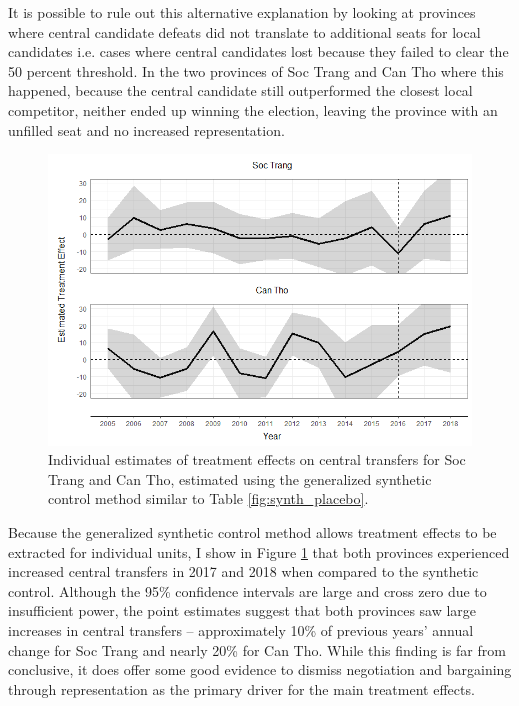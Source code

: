 \documentclass[12pt]{article}
\newcommand{\1}{\mathbbm{1}}
\begin{document}
It is possible to rule out this alternative explanation by looking at provinces where central candidate defeats did not translate to additional seats for local candidates i.e. cases where central candidates lost because they failed to clear the 50 percent threshold. In the two provinces of Soc Trang and Can Tho where this happened, because the central candidate still outperformed the closest local competitor, neither ended up winning the election, leaving the province with an unfilled seat and no increased representation. 

\begin{figure}[!htbp]
	\centering
	\includegraphics[width=\textwidth]{figure/190618_synth_results_2prov.png}
	\captionsetup{singlelinecheck=off}
	\caption[Individual synthetic control treatment effects]{Individual estimates of treatment effects on central transfers for Soc Trang and Can Tho, estimated using the generalized synthetic control method similar to Table \ref{fig:synth_placebo}.}
	\label{fig:synth_mech}
\end{figure}

Because the generalized synthetic control method allows treatment effects to be extracted for individual units, I show in Figure \ref{fig:synth_mech} that both provinces experienced increased central transfers in 2017 and 2018 when compared to the synthetic control. Although the 95\% confidence intervals are large and cross zero due to insufficient power, the point estimates suggest that both provinces saw large increases in central transfers -- approximately 10\% of previous years' annual change for Soc Trang and nearly 20\% for Can Tho. While this finding is far from conclusive, it does offer some good evidence to dismiss negotiation and bargaining through representation as the primary driver for the main treatment effects.
\end{document}
